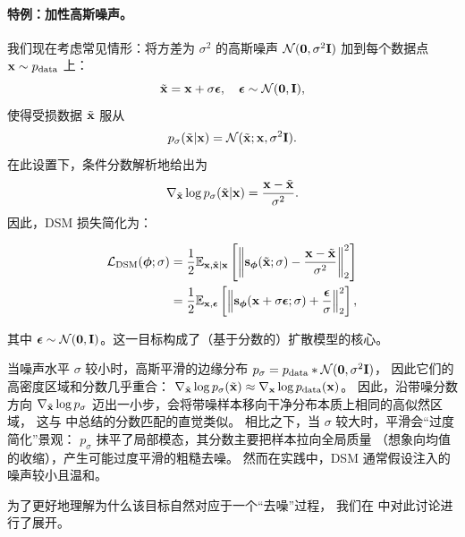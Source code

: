 \paragraph{特例：加性高斯噪声。} 我们现在考虑常见情形：将方差为 $\sigma^2$ 的高斯噪声 $\mathcal{N}(\mathbf{0}, \sigma^2 {\mathbf{I}})$ 加到每个数据点 ${\mathbf{x}} \sim p_{\text{data}}$ 上：
\[
\tilde{{\mathbf{x}}} = {\mathbf{x}} + \sigma \bm{\epsilon}, \quad \bm{\epsilon} \sim \mathcal{N}(\mathbf{0}, {\mathbf{I}}),
\]
使得受损数据 $\tilde{{\mathbf{x}}}$ 服从
\[
p_{\sigma}(\tilde{{\mathbf{x}}}|{\mathbf{x}}) = \mathcal{N}(\tilde{{\mathbf{x}}}; {\mathbf{x}}, \sigma^2 {\mathbf{I}}).
\]
在此设置下，条件分数解析地给出为
\[
\nabla_{\tilde{{\mathbf{x}}}} \log p_{\sigma}(\tilde{{\mathbf{x}}}|{\mathbf{x}}) = \frac{{\mathbf{x}} - \tilde{{\mathbf{x}}}}{\sigma^2}.
\]
因此，DSM 损失简化为：
\begin{mdframed}
\begin{align}\label{eq:gaussian-dsm}
\begin{aligned}
    \mathcal{L}_{\text{DSM}}(\bm{\phi}; \sigma) &= \frac{1}{2} \mathbb{E}_{{\mathbf{x}}, \tilde{{\mathbf{x}}}|{\mathbf{x}}} \left[ \left\lVert{\mathbf{s}}_{\bm{\phi}}(\tilde{{\mathbf{x}}}; \sigma) - \frac{{\mathbf{x}} - \tilde{{\mathbf{x}}}}{\sigma^2}\right\rVert_2^2 \right] \\
    &= \frac{1}{2} \mathbb{E}_{{\mathbf{x}}, \bm{\epsilon}} \left[ \left\lVert{\mathbf{s}}_{\bm{\phi}}({\mathbf{x}} + \sigma \bm{\epsilon}; \sigma) + \frac{\bm{\epsilon}}{\sigma}\right\rVert_2^2 \right],
\end{aligned}
\end{align}
\end{mdframed}
其中 $\bm{\epsilon} \sim \mathcal{N}(\mathbf{0}, {\mathbf{I}})$。这一目标构成了（基于分数的）扩散模型的核心。



当噪声水平 $\sigma$ 较小时，高斯平滑的边缘分布
$p_\sigma = p_{\mathrm{data}} * \mathcal{N}(\bm{0},\sigma^2 {\mathbf{I}})$，
因此它们的高密度区域和分数几乎重合：
$\nabla_{\tilde{{\mathbf{x}}}} \log p_\sigma(\tilde{{\mathbf{x}}}) \approx \nabla_{\mathbf{x}} \log p_{\mathrm{data}}({\mathbf{x}})$。
因此，沿带噪分数方向
$\nabla_{\tilde{{\mathbf{x}}}} \log p_\sigma$ 迈出一小步，会将带噪样本移向干净分布本质上相同的高似然区域，
这与  中总结的分数匹配的直觉类似。
相比之下，当 $\sigma$ 较大时，平滑会``过度简化''景观：
$p_\sigma$ 抹平了局部模态，其分数主要把样本拉向全局质量
（想象向均值的收缩），产生可能过度平滑的粗糙去噪。
然而在实践中，DSM 通常假设注入的噪声较小且温和。


为了更好地理解为什么该目标自然对应于一个``去噪''过程，
我们在  中对此讨论进行了展开。





